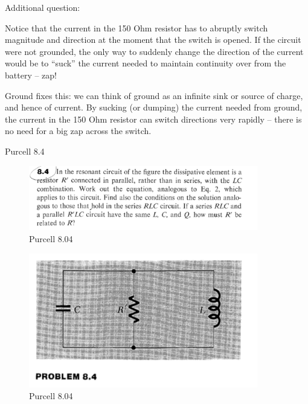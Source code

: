 \documentclass[makesolutionspdf]{esg8022pset}
\begin{document}
\begin{solution}
  Additional question: 

  Notice that the current in the 150 Ohm resistor has to abruptly switch
  magnitude and direction at the moment that the switch is opened. If
  the circuit were not grounded, the only way to suddenly change the
  direction of the current would be to ``suck'' the current needed to
  maintain continuity over from the battery -- zap!

  Ground fixes this: we can think of ground as an infinite sink or
  source of charge, and hence of current. By sucking (or dumping) the
  current needed from ground, the current in the 150 Ohm resistor can
  switch directions very rapidly -- there is no need for a big zap
  across the switch.
\end{solution}


\begin{problem}{Purcell 8.4}
  \begin{figure}[H]
    \centering
    \includegraphics[width = 10cm]{pu804}
    \caption{Purcell 8.04}
  \end{figure}
  
  \begin{figure}[H]
    \centering
    \includegraphics[width = 10cm]{figpu804}
    \caption{Purcell 8.04}
  \end{figure}
\end{problem}
\end{document}
